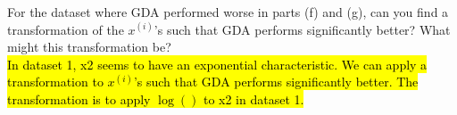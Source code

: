 \item {} For the dataset where GDA performed worse in parts (f) and (g), can you find a transformation of the $x^{(i)}$'s such that GDA performs significantly better? What might this transformation be?\\[50pt]

\hl{In dataset 1, x2 seems to have an exponential characteristic. We can apply a transformation to $x^{(i)}$'s such that GDA performs significantly better. The transformation is to apply $\log()$ to x2 in dataset 1.}